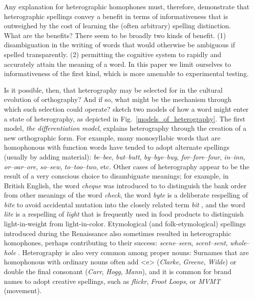 \documentclass[doc,biblatex]{apa7}
\begin{document}
Any explanation for heterographic homophones must, therefore, demonstrate that heterographic spellings convey a benefit in terms of informativeness that is outweighed by the cost of learning the (often arbitrary) spelling distinction. What are the benefits? There seem to be broadly two kinds of benefit. (1) disambiguation in the writing of words that would otherwise be ambiguous if spelled transparently. (2) permitting the cognitive system to rapidly and accurately attain the meaning of a word. In this paper we limit ourselves to informativeness of the first kind, which is more amenable to experimental testing.

Is it possible, then, that heterography may be selected for in the cultural evolution of orthography? And if so, what might be the mechanism through which such selection could operate? \textcite[pp.~325--326]{Berg:2021} sketch two models of how a word might enter a state of heterography, as depicted in Fig.~\ref{models_of_heterography}. The first model, \textit{the differentiation model}, explains heterography through the creation of a new orthographic form. For example, many monosyllabic words that are homophonous with function words have tended to adopt alternate spellings (usually by adding material): \textit{be}--\textit{bee}, \textit{but}--\textit{butt}, \textit{by}--\textit{bye}--\textit{buy}, \textit{for}--\textit{fore}--\textit{four}, \textit{in}--\textit{inn}, \textit{or}--\textit{oar}--\textit{ore}, \textit{so}--\textit{sew}, \textit{to}--\textit{too}--\textit{two}, etc. Other cases of heterography appear to be the result of a very conscious choice to disambiguate meanings; for example, in British English, the word \textit{cheque} was introduced to to distinguish the bank order from other meanings of the word \textit{check}, the word \textit{byte} is a deliberate respelling of \textit{bite} to avoid accidental mutation into the closely related term \textit{bit} \parencite{Buchholz:1977}, and the word \textit{lite} is a respelling of \textit{light} that is frequently used in food products to distinguish light-in-weight from light-in-color. Etymological (and folk-etymological) spellings introduced during the Renaissance also sometimes resulted in heterographic homophones, perhaps contributing to their success: \textit{scene}--\textit{seen}, \textit{scent}--\textit{sent}, \textit{whole}--\textit{hole} \parencite[pp.~58--59]{Scragg:1974}. Heterography is also very common among proper nouns: Surnames that are homophonous with ordinary nouns often add <e> (\textit{Clarke}, \textit{Greene}, \textit{Wilde}) or double the final consonant (\textit{Carr}, \textit{Hogg}, \textit{Mann}), and it is common for brand names to adopt creative spellings, such as \textit{flickr}, \textit{Froot Loops}, or \textit{MVMT} (movement).
\end{document}
